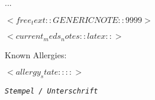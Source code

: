 \documentclass[
	version=last,
	paper=portrait,
	paper=a4,
	DIV=9,									%
	BCOR=0mm,								%
	fontsize=12pt,							%
	parskip=half+,							%
	headsepline=on,
	footsepline=on,
	titlepage=false
]{scrartcl}
\begin{document}

...


$<free_text::GENERIC NOTE::9999>$

$<current_meds_notes::latex::>$

Known Allergies:

$<allergy_state::::>$


\medskip{}

\begin{flushright}
\texttt{\textsl{\footnotesize Stempel / Unterschrift}}
\par\end{flushright}

\end{document}
